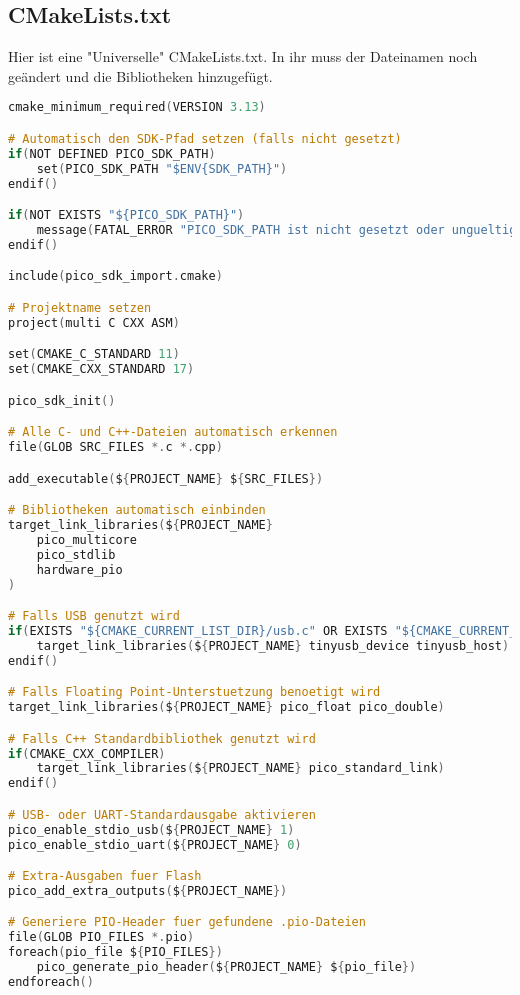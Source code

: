 \documentclass[a4paper,12pt,twoside]{article}
\begin{document}
\subsection{CMakeLists.txt}
Hier ist eine "Universelle" CMakeLists.txt.
In ihr muss der Dateinamen noch geändert und die Bibliotheken hinzugefügt.
\begin{center}
	\begin{minipage}{1.0\textwidth}
		\begin{lstlisting}[language=C]
cmake_minimum_required(VERSION 3.13)

# Automatisch den SDK-Pfad setzen (falls nicht gesetzt)
if(NOT DEFINED PICO_SDK_PATH)
    set(PICO_SDK_PATH "$ENV{SDK_PATH}")
endif()

if(NOT EXISTS "${PICO_SDK_PATH}")
    message(FATAL_ERROR "PICO_SDK_PATH ist nicht gesetzt oder ungueltig!")
endif()

include(pico_sdk_import.cmake)

# Projektname setzen
project(multi C CXX ASM)

set(CMAKE_C_STANDARD 11)
set(CMAKE_CXX_STANDARD 17)

pico_sdk_init()

# Alle C- und C++-Dateien automatisch erkennen
file(GLOB SRC_FILES *.c *.cpp)

add_executable(${PROJECT_NAME} ${SRC_FILES})

# Bibliotheken automatisch einbinden
target_link_libraries(${PROJECT_NAME}
    pico_multicore
    pico_stdlib
    hardware_pio
)

# Falls USB genutzt wird
if(EXISTS "${CMAKE_CURRENT_LIST_DIR}/usb.c" OR EXISTS "${CMAKE_CURRENT_LIST_DIR}/usb.cpp")
    target_link_libraries(${PROJECT_NAME} tinyusb_device tinyusb_host)
endif()

# Falls Floating Point-Unterstuetzung benoetigt wird
target_link_libraries(${PROJECT_NAME} pico_float pico_double)

# Falls C++ Standardbibliothek genutzt wird
if(CMAKE_CXX_COMPILER)
    target_link_libraries(${PROJECT_NAME} pico_standard_link)
endif()

# USB- oder UART-Standardausgabe aktivieren
pico_enable_stdio_usb(${PROJECT_NAME} 1)
pico_enable_stdio_uart(${PROJECT_NAME} 0)

# Extra-Ausgaben fuer Flash
pico_add_extra_outputs(${PROJECT_NAME})

# Generiere PIO-Header fuer gefundene .pio-Dateien
file(GLOB PIO_FILES *.pio)
foreach(pio_file ${PIO_FILES})
    pico_generate_pio_header(${PROJECT_NAME} ${pio_file})
endforeach()
	  \end{lstlisting}
	\end{minipage}
\end{center}
\end{document}
